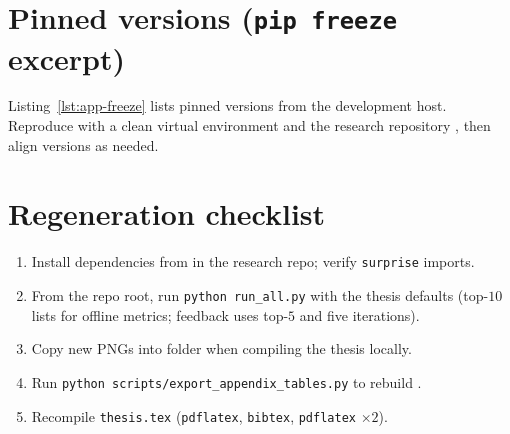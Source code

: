 \section{Pinned versions (\texttt{pip freeze} excerpt)}
Listing~\ref{lst:app-freeze} lists pinned versions from the development host. Reproduce with a clean virtual environment and the research repository , then align versions as needed.

\lstset{basicstyle=\ttfamily\footnotesize,frame=single,breaklines=true,columns=fullflexible}


\section{Regeneration checklist}
\begin{enumerate}
  \item Install dependencies from  in the research repo; verify \texttt{surprise} imports.
  \item From the repo root, run \texttt{python run\_all.py} with the thesis defaults (top-$10$ lists for offline metrics; feedback uses top-$5$ and five iterations).
  \item Copy new PNGs into folder  when compiling the thesis locally.
  \item Run \texttt{python scripts/export\_appendix\_tables.py} to rebuild .
  \item Recompile \texttt{thesis.tex} (\texttt{pdflatex}, \texttt{bibtex}, \texttt{pdflatex} $\times 2$).
\end{enumerate}
